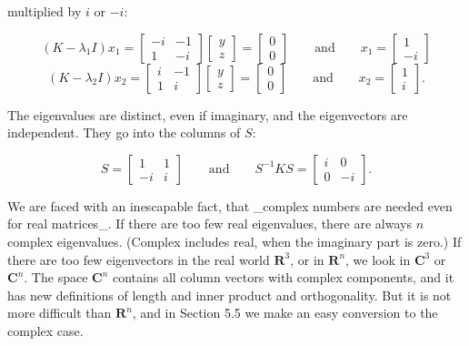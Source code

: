 multiplied by \(i\) or \(-i\):

\[(K-\lambda_{1}I)x_{1} =\begin{bmatrix}-i&-1\\ 1&-i\end{bmatrix}\begin{bmatrix}y\\ z\end{bmatrix}=\begin{bmatrix}0\\ 0\end{bmatrix}\qquad\text{and}\qquad x_{1}=\begin{bmatrix}1\\ -i\end{bmatrix}\] \[(K-\lambda_{2}I)x_{2} =\begin{bmatrix}i&-1\\ 1&i\end{bmatrix}\begin{bmatrix}y\\ z\end{bmatrix}=\begin{bmatrix}0\\ 0\end{bmatrix}\qquad\text{and}\qquad x_{2}=\begin{bmatrix}1\\ i\end{bmatrix}.\]

The eigenvalues are distinct, even if imaginary, and the eigenvectors are independent. They go into the columns of \(S\):

\[S=\begin{bmatrix}1&1\\ -i&i\end{bmatrix}\qquad\text{and}\qquad S^{-1}KS=\begin{bmatrix}i&0\\ 0&-i\end{bmatrix}.\]

We are faced with an inescapable fact, that _complex numbers are needed even for real matrices_. If there are too few real eigenvalues, there are always \(n\) complex eigenvalues. (Complex includes real, when the imaginary part is zero.) If there are too few eigenvectors in the real world \(\mathbf{R}^{3}\), or in \(\mathbf{R}^{n}\), we look in \(\mathbf{C}^{3}\) or \(\mathbf{C}^{n}\). The space \(\mathbf{C}^{n}\) contains all column vectors with complex components, and it has new definitions of length and inner product and orthogonality. But it is not more difficult than \(\mathbf{R}^{n}\), and in Section 5.5 we make an easy conversion to the complex case.

